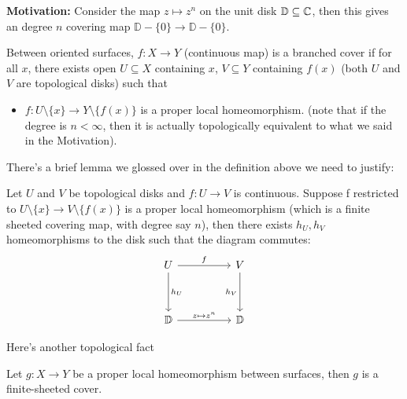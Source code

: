 \documentclass{article}
\begin{document}
\textbf{Motivation:} Consider the map $z \mapsto z^n$ on the unit disk $\mathbb{D} \subseteq \mathbb{C}$, then this gives an degree $n$ covering map $\mathbb{D} - \{0\} \to \mathbb{D} - \{0\}$.

\begin{definition}
    Between oriented surfaces, $f: X \to Y$ (continuous map) is a branched cover if for all $x$, there exists open $U \subseteq X$ containing $x$, $V \subseteq Y$ containing $f(x)$ (both $U$ and $V$ are topological disks) such that
    \begin{itemize}
        \item $f: U \setminus \{x\} \to Y \setminus \{f(x)\}$  is a proper local homeomorphism. (note that if the degree is $n < \infty$, then it is actually topologically equivalent to what we said in the Motivation).
    \end{itemize}
\end{definition}

There's a brief lemma we glossed over in the definition above we need to justify:
\begin{lemma}[Lemma B]
    Let $U$ and $V$ be topological disks and $f: U \to V$ is continuous. Suppose f restricted to $U \setminus \{x\} \to V \setminus \{f(x)\}$ is a proper local homeomorphism (which is a finite sheeted covering map, with degree say $n$), then there exists $h_U, h_V$ homeomorphisms to the disk such that the diagram commutes:
\[\begin{tikzcd}
	U && V \\
	\\
	{\mathbb{D}} && {\mathbb{D}}
	\arrow["{h_U}", from=1-1, to=3-1]
	\arrow["f", from=1-1, to=1-3]
	\arrow["{h_V}"', from=1-3, to=3-3]
	\arrow["{z \mapsto z^n}", from=3-1, to=3-3]
\end{tikzcd}\]
\end{lemma}

Here's another topological fact
\begin{exercise}
    Let $g: X \to Y$ be a proper local homeomorphism between surfaces, then $g$ is a finite-sheeted cover.
\end{exercise}
\end{document}
